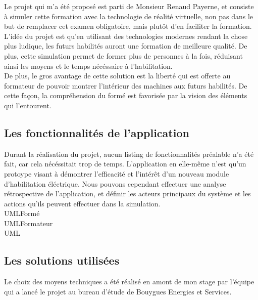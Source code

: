 \documentclass[a4paper]{article}
\begin{document}
        Le projet qui m'a été proposé est parti de Monsieur Renaud Payerne, et consiste à simuler cette formation avec la technologie de réalité virtuelle, non pas dans le but de remplacer cet examen obligatoire, mais plutôt d'en faciliter la formation. \\

        L'idée du projet est qu'en utilisant des technologies modernes rendant la chose plus ludique, les futurs habilités auront une formation de meilleure qualité. De plus, cette simulation permet de former plus de personnes à la fois, réduisant ainsi les moyens et le temps nécéssaire à l'habilitation. \\   

        De plus, le gros avantage de cette solution est la liberté qui est offerte au formateur de pouvoir montrer l'intérieur des machines aux futurs habilités. De cette façon, la compréhension du formé est favorisée par la vision des éléments qui l'entourent. \\

    \subsection{Les fonctionnalités de l'application}

    Durant la réalisation du projet, aucun listing de fonctionnalités préalable n'a été fait, car cela nécéssitait trop de temps. L'application en elle-même n'est qu'un protoype visant à démontrer l'efficacité et l'intérêt d'un nouveau module d'habilitation éléctrique. Nous pouvons cependant effectuer une analyse rétrospective de l'application, et définir les acteurs principaux du système et les actions qu'ils peuvent effectuer dans la simulation. \\

    UMLFormé \\

    UMLFormateur \\

    UML \\

    \subsection{Les solutions utilisées}

    Le choix des moyens techniques a été réalisé en amont de mon stage par l'équipe qui a lancé le projet au bureau d'étude de Bouygues Energies et Services. \\ 
\end{document}

